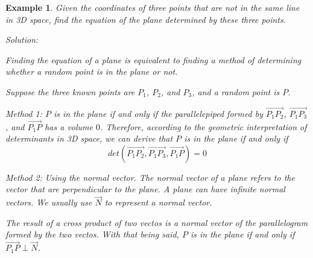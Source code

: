 \documentclass{article}
\newtheorem{example}{Example}
\begin{document}
\begin{example}
Given the coordinates of three points that are not in the same line in 3D space,
find the equation of the plane determined by these three points.

Solution:

Finding the equation of a plane is equivalent to finding a method of
determining whether a random point is in the plane or not.

Suppose the three known points are $P_1$, $P_2$, and $P_3$, and a random point
is $P$.

Method 1: $P$ is in the plane if and only if the parallelepiped formed by
$\vec{P_1P_2}$, $\vec{P_1P_3}$, and $\vec{P_1P}$ has a volume $0$. Therefore,
according to the geometric interpretation of determinants in 3D space, we can
derive that $P$ is in the plane if and only if
\[
  det(\vec{P_1P_2}, \vec{P_1P_3}, \vec{P_1P}) = 0
\]

Method 2: Using the normal vector. The normal vector of a plane refers to the
vector that are perpendicular to the plane. A plane can have infinite normal
vectors. We usually use $\vec{N}$ to represent a normal vector. 

The result of a cross product of two vectos is a normal vector of the
parallelogram formed by the two vectos. With that being said, $P$ is in the
plane if and only if $\vec{P_1P} \perp \vec{N}$.

\end{example}
\end{document}
